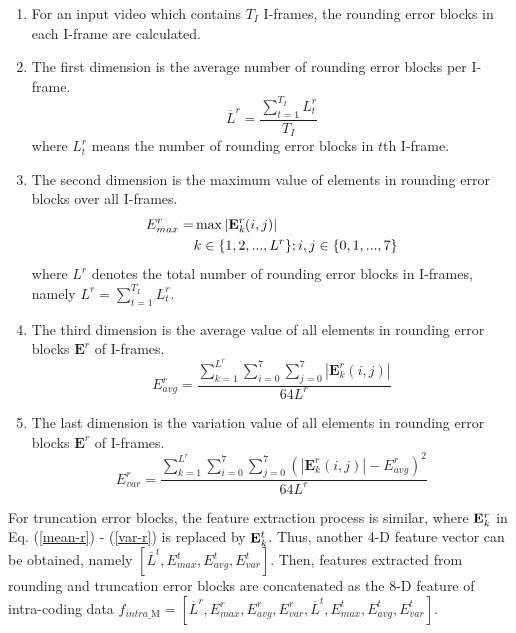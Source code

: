 \documentclass[journal,sort]{IEEEtran}
\begin{document}
\begin{enumerate}	
	\item For an input video which contains $T_I$ I-frames, the rounding error blocks in each I-frame are calculated.
	\item The first dimension is the average number of rounding error blocks per I-frame.
	\begin{equation}
	\overline{L}^r=\frac{\sum_{t=1}^{T_I} L_t^r}{T_I} \label{mean-r}
	\end{equation}
	where $L_t^r$ means the number of rounding error blocks in $t$th I-frame.
	\item The second dimension is the maximum value of elements in rounding error blocks over all I-frames.
	\begin{equation}
	\begin{aligned}
	E^r_{max} = &\max |\mathbf{E}^r_\emph{k}(i,j)|\\\
	&k\in\{1,2,...,L^r\};i,j\in\{0,1,...,7\}%
	\end{aligned}
	\end{equation}
	where $L^r$ denotes the total number of rounding error blocks in I-frames, namely $L^r = \sum_{t=1}^{T_I} L_t^r$. 
	\item The third dimension is the average value of all elements in rounding error blocks $\mathbf{E}^r$ of I-frames.
	\begin{equation}
    E^r_{avg} = \frac{\sum\limits^{L^r}_{k=1}\sum\limits^7_{i=0}\sum\limits^7_{j=0}|\mathbf{E}^r_k(i,j)|}{64L^r}
	\end{equation}	
	\item The last dimension is the variation value of all elements in rounding error blocks $\mathbf{E}^r$ of I-frames.
	\begin{equation}
	E^r_{var} = \frac{\sum\limits^{L^r}_{k=1}\sum\limits^7_{i=0}\sum\limits^7_{j=0}\left(|\mathbf{E}^r_k(i,j)|-E^r_{avg}\right)^2}{64L^r}\label{var-r}
	\end{equation}
\end{enumerate}

 For truncation error blocks, the feature extraction process is similar, where $\mathbf{E}^r_\emph{k}$ in Eq. (\ref{mean-r}) - (\ref{var-r}) is replaced by $\mathbf{E}^t_\emph{k}$. Thus, another 4-D feature vector can be obtained, namely $\left[\overline{L}^t,E^t_{max},E^t_{avg},E^t_{var}\right]$. Then, features extracted from rounding and truncation error blocks are concatenated as the 8-D feature of intra-coding data $f_{intra\_\text{M}} =$$ \left[\overline{L}^r,E^r_{max},E^r_{avg},E^r_{var},\overline{L}^t,E^t_{max},E^t_{avg},E^t_{var}\right]$.
 
\end{document}
